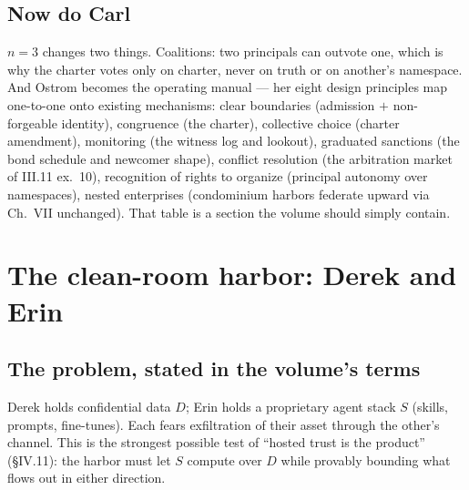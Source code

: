 \documentclass[11pt,a4paper]{article}
\theoremstyle{definition}
\theoremstyle{remark}
\begin{document}
\subsection{Now do Carl}
$n = 3$ changes two things. Coalitions: two principals can outvote one, which is why the charter votes only on charter, never on truth or on another's namespace. And Ostrom becomes the operating manual --- her eight design principles map one-to-one onto existing mechanisms: clear boundaries (admission $+$ non-forgeable identity), congruence (the charter), collective choice (charter amendment), monitoring (the witness log and lookout), graduated sanctions (the bond schedule and newcomer shape), conflict resolution (the arbitration market of III.11 ex.~10), recognition of rights to organize (principal autonomy over namespaces), nested enterprises (condominium harbors federate upward via Ch.~VII unchanged). That table is a section the volume should simply contain.

\section{The clean-room harbor: Derek and Erin}\label{sec:cleanroom}

\subsection{The problem, stated in the volume's terms}
Derek holds confidential data $D$; Erin holds a proprietary agent stack $S$ (skills, prompts, fine-tunes). Each fears exfiltration of their asset through the other's channel. This is the strongest possible test of ``hosted trust is the product'' (\S IV.11): the harbor must let $S$ compute over $D$ while provably bounding what flows out in either direction.
\end{document}

